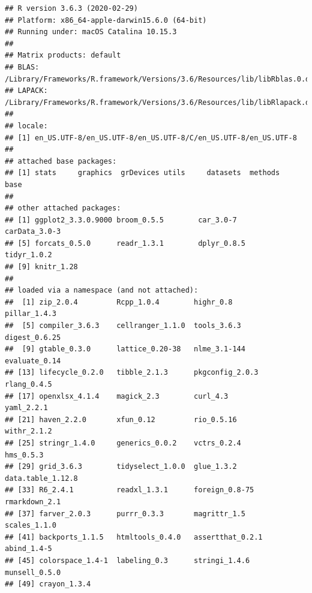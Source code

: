 \documentclass[]{article}
\begin{document}
\begin{verbatim}
## R version 3.6.3 (2020-02-29)
## Platform: x86_64-apple-darwin15.6.0 (64-bit)
## Running under: macOS Catalina 10.15.3
## 
## Matrix products: default
## BLAS:   /Library/Frameworks/R.framework/Versions/3.6/Resources/lib/libRblas.0.dylib
## LAPACK: /Library/Frameworks/R.framework/Versions/3.6/Resources/lib/libRlapack.dylib
## 
## locale:
## [1] en_US.UTF-8/en_US.UTF-8/en_US.UTF-8/C/en_US.UTF-8/en_US.UTF-8
## 
## attached base packages:
## [1] stats     graphics  grDevices utils     datasets  methods   base     
## 
## other attached packages:
## [1] ggplot2_3.3.0.9000 broom_0.5.5        car_3.0-7          carData_3.0-3     
## [5] forcats_0.5.0      readr_1.3.1        dplyr_0.8.5        tidyr_1.0.2       
## [9] knitr_1.28        
## 
## loaded via a namespace (and not attached):
##  [1] zip_2.0.4         Rcpp_1.0.4        highr_0.8         pillar_1.4.3     
##  [5] compiler_3.6.3    cellranger_1.1.0  tools_3.6.3       digest_0.6.25    
##  [9] gtable_0.3.0      lattice_0.20-38   nlme_3.1-144      evaluate_0.14    
## [13] lifecycle_0.2.0   tibble_2.1.3      pkgconfig_2.0.3   rlang_0.4.5      
## [17] openxlsx_4.1.4    magick_2.3        curl_4.3          yaml_2.2.1       
## [21] haven_2.2.0       xfun_0.12         rio_0.5.16        withr_2.1.2      
## [25] stringr_1.4.0     generics_0.0.2    vctrs_0.2.4       hms_0.5.3        
## [29] grid_3.6.3        tidyselect_1.0.0  glue_1.3.2        data.table_1.12.8
## [33] R6_2.4.1          readxl_1.3.1      foreign_0.8-75    rmarkdown_2.1    
## [37] farver_2.0.3      purrr_0.3.3       magrittr_1.5      scales_1.1.0     
## [41] backports_1.1.5   htmltools_0.4.0   assertthat_0.2.1  abind_1.4-5      
## [45] colorspace_1.4-1  labeling_0.3      stringi_1.4.6     munsell_0.5.0    
## [49] crayon_1.3.4
\end{verbatim}
\end{document}

